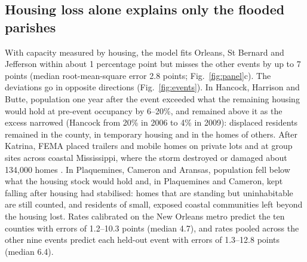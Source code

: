 \documentclass[11pt]{article}
\begin{document}
\subsection{Housing loss alone explains only the flooded parishes}
With capacity measured by housing, the model fits Orleans, St Bernard and Jefferson within about 1 percentage point but misses the other events by up to 7 points (median root-mean-square error 2.8 points; Fig.~\ref{fig:panel}c). The deviations go in opposite directions (Fig.~\ref{fig:events}). In Hancock, Harrison and Butte, population one year after the event exceeded what the remaining housing would hold at pre-event occupancy by 6--20\%, and remained above it as the excess narrowed (Hancock from 20\% in 2006 to 4\% in 2009): displaced residents remained in the county, in temporary housing and in the homes of others. After Katrina, FEMA placed trailers and mobile homes on private lots and at group sites across coastal Mississippi, where the storm destroyed or damaged about 134{,}000 homes \citep{GAO2007,EvansCowley2011}. In Plaquemines, Cameron and Aransas, population fell below what the housing stock would hold and, in Plaquemines and Cameron, kept falling after housing had stabilised: homes that are standing but uninhabitable are still counted, and residents of small, exposed coastal communities left beyond the housing lost. Rates calibrated on the New Orleans metro predict the ten counties with errors of 1.2--10.3 points (median 4.7), and rates pooled across the other nine events predict each held-out event with errors of 1.3--12.8 points (median 6.4).
\end{document}
